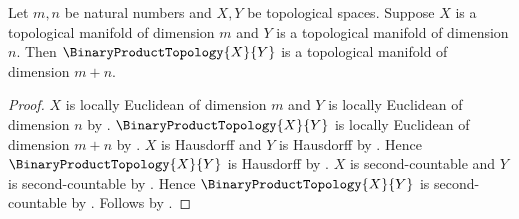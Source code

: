 \begin{theorem}\label{product_of_topological_manifolds}
    Let $m,n$ be natural numbers and $X,Y$ be topological spaces.
    Suppose $X$ is a topological manifold of dimension $m$ and
        $Y$ is a topological manifold of dimension $n$.
    Then $\BinaryProductTopology{X}{Y}$ is a topological manifold of dimension $m+n$.
\end{theorem}
\begin{proof}
    $X$ is locally Euclidean of dimension $m$ and $Y$ is locally Euclidean of dimension $n$ by
        .
    $\BinaryProductTopology{X}{Y}$ is locally Euclidean of dimension $m+n$ by
        .
    $X$ is Hausdorff and $Y$ is Hausdorff by .
    Hence $\BinaryProductTopology{X}{Y}$ is Hausdorff by .
    $X$ is second-countable and $Y$ is second-countable by .
    Hence $\BinaryProductTopology{X}{Y}$ is second-countable by
        .
    Follows by .
\end{proof}

